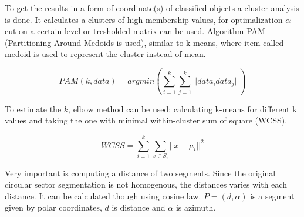 To get the results in a form of coordinate(s) of classified objects a cluster analysis is done. It calculates
a clusters of high membership values, for optimalization $\alpha$-cut on a certain level or tresholded
matrix can be used. Algorithm PAM (Partitioning Around Medoids is used), similar to k-means, where item called
medoid is used to represent the cluster instead of mean.

\begin{equation}
\mathit{PAM}(k, data) = argmin \left( \sum_{i=1}^{k} \sum_{j=1}^{k} ||data_{i} data_{j}||  \right)
\end{equation}



To estimate the $k$, elbow method can be used: calculating k-means for different k values and taking the one with
minimal within-cluster sum of square (WCSS).\cite{ClusterAnalysis} \cite{VagueNatureInformation}

\begin{equation}
\mathit{WCSS} = \sum_{i=1}^{k} \sum_{x \in S_i} ||x - \mu_i||^2
\end{equation}

Very important is computing a distance of two segments. Since the original circular sector segmentation
is not homogenous, the distances varies with each distance. It can be calculated though using
cosine law. $P = (d, \alpha)$ is a segment given by polar coordinates, $d$ is distance and $\alpha$ is
azimuth.


